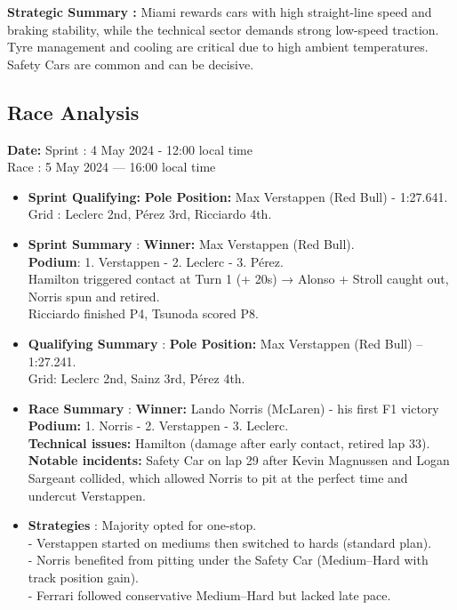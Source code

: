 \textbf{Strategic Summary :}
Miami rewards cars with high straight-line speed and braking stability, while the technical sector demands strong low-speed traction. Tyre management and cooling are critical due to high ambient temperatures. Safety Cars are common and can be decisive.


\subsection{Race Analysis}

\textbf{Date:} Sprint : 4 May 2024 - 12:00 local time\\
Race : 5 May 2024 — 16:00 local time 

\begin{itemize}
    \item \textbf{Sprint Qualifying:} \textbf{Pole Position:} Max Verstappen (Red Bull) - 1:27.641.\\
    Grid : Leclerc 2nd, Pérez 3rd, Ricciardo 4th.

    \item \textbf{Sprint Summary} : \textbf{Winner:} Max Verstappen (Red Bull). \\
    \textbf{Podium}: 1. Verstappen - 2. Leclerc - 3. Pérez. \\
    Hamilton triggered contact at Turn 1 (+ 20s) → Alonso + Stroll caught out, Norris spun and retired.\\
    Ricciardo finished P4, Tsunoda scored P8. 
    
    \item \textbf{Qualifying Summary} : \textbf{Pole Position:} Max Verstappen (Red Bull) – 1:27.241. \\
    Grid: Leclerc 2nd, Sainz 3rd, Pérez 4th.
    
    \item \textbf{Race Summary} : \textbf{Winner:} Lando Norris (McLaren) - his first F1 victory\\
    \textbf{Podium:} 1. Norris - 2. Verstappen - 3. Leclerc.\\
    \textbf{Technical issues:} Hamilton (damage after early contact, retired lap 33).
    \textbf{Notable incidents:} Safety Car on lap 29 after Kevin Magnussen and Logan Sargeant collided, which allowed Norris to pit at the perfect time and undercut Verstappen.
    
    \item \textbf{Strategies} : Majority opted for one-stop.\\
    - Verstappen started on mediums then switched to hards (standard plan). \\
    - Norris benefited from pitting under the Safety Car (Medium–Hard with track position gain).\\
    - Ferrari followed conservative Medium–Hard but lacked late pace.
    

\end{itemize}
